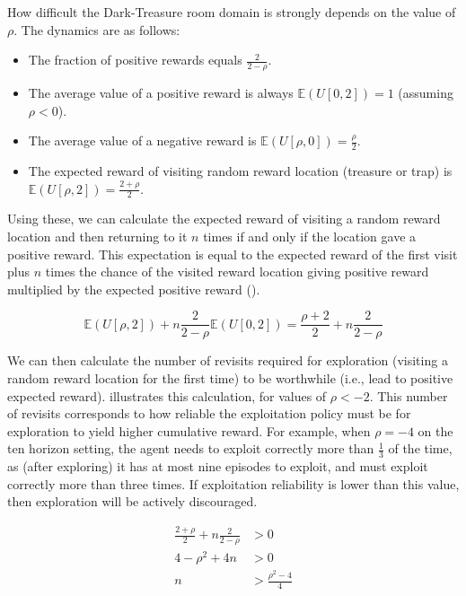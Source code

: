 \documentclass{article}
\begin{document}
How difficult the Dark-Treasure room domain is strongly depends on the value of \(\rho\). The dynamics are as follows:

\begin{itemize}
    \item The fraction of positive rewards equals \(\frac{2}{2-\rho}\).
    \item The average value of a positive reward is always \(\mathbb{E}(U[0, 2]) = 1\) (assuming \(\rho < 0\)).
    \item The average value of a negative reward is \(\mathbb{E}(U[\rho, 0]) = \frac{\rho}{2}\).
    \item The expected reward of visiting random reward location (treasure or trap) is \(\mathbb{E}(U[\rho, 2]) = \frac{2 + \rho}{2}\).
\end{itemize}

Using these, we can calculate the expected reward of visiting a random reward location and then returning to it \(n\) times if and only if the location gave a positive reward. This expectation is equal to the expected reward of the first visit plus \(n\) times the chance of the visited reward location giving positive reward multiplied by the expected positive reward ().

\begin{equation}
\label{eqn:nexpct}
\mathbb{E}(U[\rho, 2]) + n\frac{2}{2-\rho} \mathbb{E}(U[0, 2]) = \frac{\rho+2}{2} + n\frac{2}{2-\rho}
\end{equation}

We can then calculate the number of revisits required for exploration (visiting a random reward location for the first time) to be worthwhile (i.e., lead to positive expected reward).  illustrates this calculation, for values of \(\rho < -2\). This number of revisits corresponds to how reliable the exploitation policy must be for exploration to yield higher cumulative reward. For example, when \(\rho = -4\) on the ten horizon setting, the agent needs to exploit correctly more than \(\frac{1}{3}\) of the time, as (after exploring) it has at most nine episodes to exploit, and must exploit correctly more than three times. If exploitation reliability is lower than this value, then exploration will be actively discouraged.

\begin{align}
\label{eqn:rhocalc}
\frac{2+\rho}{2} + n\frac{2}{2-\rho} &> 0 \\
4 - \rho^2 + 4n &> 0 \\
n &> \frac{\rho^2 - 4}{4}
\end{align}
\end{document}

